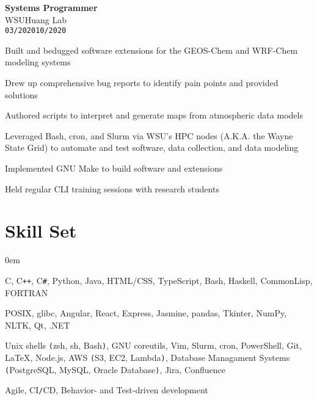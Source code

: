 \documentclass[10pt]{article}
\newenvironment{itemize*}%
  {\begin{itemize}[leftmargin=*,label=\faChevronRight]%
    \setlength{\itemsep}{0pt}%
    \setlength{\parskip}{0pt}%
    \setlength{\parsep}{0pt}}%
  {\end{itemize}}
\newcommand\workexp[5]{
    \begin{minipage}[t]{0.215\textwidth}
            \raggedleft
                \textbf{\fontsize{13}{10}\selectfont #1}\\ 
                #2\\
                \small\texttt{#3}\textendash \texttt{#4}
    \end{minipage}\hspace*{5pt}%
    \begin{minipage}[t]{0.75\textwidth}
        \raggedright
        \fontsize{10}{10}\selectfont#5
    \end{minipage}
}
\begin{document}
\workexp{Systems Programmer}{WSU\textendash Huang Lab}{03/2020}{10/2020}{%
    \begin{itemize*}
        \item Built and bedugged software extensions for the GEOS-Chem and WRF-Chem modeling systems
        \item Drew up comprehensive bug reports to identify pain points and provided solutions
        \item Authored scripts to interpret and generate maps from atmospheric data models
        \item Leveraged Bash, cron, and Slurm via WSU's HPC nodes (A.K.A. the Wayne State Grid) to automate and test software, 
              data collection, and data modeling
        \item Implemented GNU Make to build software and extensions
        \item Held regular CLI training sessions with research students
    \end{itemize*}%
}

\vspace*{-10pt}
\section*{Skill Set}
\vspace*{-8pt}\hspace*{10pt}\begin{minipage}{0.935\textwidth}
    \begin{description}
        \itemsep0em
        \raggedright
        \item[Languages] C, C\texttt{++}, C\texttt{\#}, Python, Java, HTML/CSS, TypeScript, Bash, Haskell, CommonLisp, FORTRAN
        \item[Frameworks\texttt{/}Libraries] POSIX, glibc, Angular, React, Express, Jasmine, pandas, Tkinter, NumPy, NLTK,
            Qt, .NET
        \item[Tools] Unix shells \texttt{(}zsh, sh, Bash\texttt{)}, GNU coreutils, Vim, Slurm, cron, PowerShell, Git, \LaTeX, Node.js,
            AWS \texttt{(}S3, EC2, Lambda\texttt{)}, Database Managament Systems \texttt{(}PostgreSQL, MySQL, Oracle
            Database\texttt{)}, Jira, Confluence
        \item[Methodologies] Agile, CI\texttt{/}CD, Behavior- and Test-driven development
    \end{description}
\end{minipage}

\vspace*{-10pt}
\end{document}
